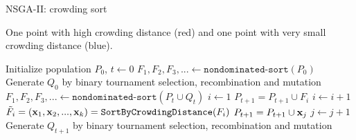 \begin{frame}[allowframebreaks]{NSGA-II: crowding sort}
\begin{footnotesize}
One point with high crowding distance (red) and one point with very small crowding distance (blue).
\end{footnotesize}

\framebreak
\begin{algorithm}[H]

  \begin{center}
  \caption{NSGA-II}
    \begin{algorithmic}[1]
   	\begin{footnotesize}
    \STATE Initialize population $P_0$, $t \leftarrow 0$
    \STATE $F_1, F_2, F_3, ... \leftarrow \texttt{nondominated-sort}(P_0)$
    \STATE Generate $Q_0$ by binary tournament selection, recombination and mutation %
      \REPEAT
        \STATE $F_1, F_2, F_3, ... \leftarrow \texttt{nondominated-sort}(P_t \cup Q_t)$
        \STATE $i \leftarrow 1$
        	\STATE $P_{t + 1} = P_{t + 1} \cup F_i$
        	\STATE $i \leftarrow i + 1$
    	\ENDWHILE
        \STATE $\tilde F_i = (\mathbf{x}_1, \mathbf{x}_2, ..., \mathbf{x}_k)= \texttt{SortByCrowdingDistance}(F_i)$
        	\STATE $P_{t + 1} = P_{t + 1} \cup \mathbf{x}_j$
        	\STATE $j \leftarrow j + 1$
        \ENDWHILE
        \STATE Generate $Q_{t + 1}$ by binary tournament selection, recombination and mutation %
      \vspace*{-0.3cm}
      \end{footnotesize}
    \end{algorithmic}
    \end{center}
\end{algorithm}

\end{frame}





